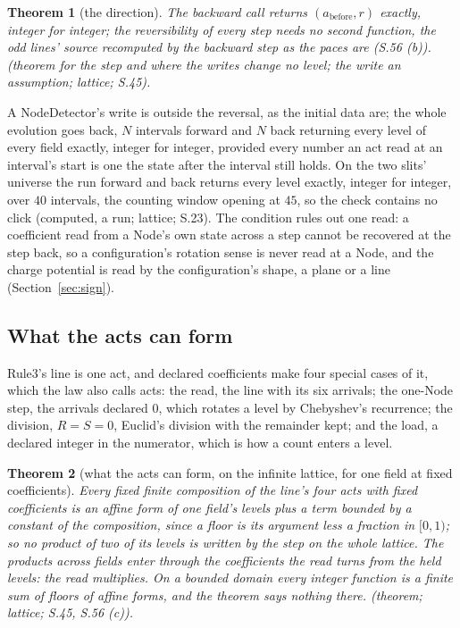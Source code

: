 \documentclass[pdflatex,sn-mathphys-num]{sn-jnl}
\newcommand{\abefore}{a_{\mathrm{before}}}
\theoremstyle{thmstyleone}
\newtheorem{theorem}{Theorem}
\theoremstyle{thmstyletwo}
\begin{document}
\begin{theorem}[the direction]\label{th:direction}
The backward call returns $(\abefore, r)$ exactly, integer for integer; the reversibility of every step needs no second function, the odd lines' source recomputed by the backward step as the paces are (S.56 (b)). (theorem for the step and where the writes change no level; the write an assumption; lattice; S.45).
\end{theorem}

A NodeDetector's write is outside the reversal, as the initial data are; the whole evolution goes back, $N$ intervals forward and $N$ back returning every level of every field exactly, integer for integer, provided every number an act read at an interval's start is one the state after the interval still holds. On the two slits' universe the run forward and back returns every level exactly, integer for integer, over $40$ intervals, the counting window opening at $45$, so the check contains no click (computed, a run; lattice; S.23). The condition rules out one read: a coefficient read from a Node's own state across a step cannot be recovered at the step back, so a configuration's rotation sense is never read at a Node, and the charge potential is read by the configuration's shape, a plane or a line (Section~\ref{sec:sign}).

\subsection{What the acts can form}\label{sec:acts}

Rule3's line is one act, and declared coefficients make four special cases of it, which the law also calls acts: the read, the line with its six arrivals; the one-Node step, the arrivals declared $0$, which rotates a level by Chebyshev's recurrence; the division, $R = S = 0$, Euclid's division with the remainder kept; and the load, a declared integer in the numerator, which is how a count enters a level.

\begin{theorem}[what the acts can form, on the infinite lattice, for one field at fixed coefficients]\label{th:acts}
Every fixed finite composition of the line's four acts with fixed coefficients is an affine form of one field's levels plus a term bounded by a constant of the composition, since a floor is its argument less a fraction in $[0, 1)$; so no product of two of its levels is written by the step on the whole lattice. The products across fields enter through the coefficients the read turns from the held levels: the read multiplies. On a bounded domain every integer function is a finite sum of floors of affine forms, and the theorem says nothing there. (theorem; lattice; S.45, S.56 (c)).
\end{theorem}
\end{document}
